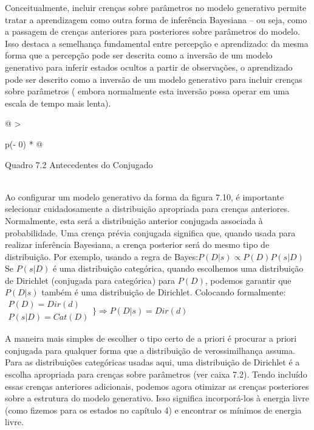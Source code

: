 \documentclass[
  12pt,
]{book}
\begin{document}
Conceitualmente, incluir crenças sobre parâmetros no modelo generativo permite tratar a aprendizagem como outra forma de inferência Bayesiana -- ou seja, como a passagem de crenças anteriores para posteriores sobre parâmetros do modelo. Isso destaca a semelhança fundamental entre percepção e aprendizado: da mesma forma que a percepção pode ser descrita como a inversão de um modelo generativo para inferir estados ocultos a partir de observações, o aprendizado pode ser descrito como a inversão de um modelo generativo para incluir crenças sobre parâmetros ( embora normalmente esta inversão possa operar em uma escala de tempo mais lenta).

\begin{longtable}[]{@{}
  >{\raggedright\arraybackslash}p{(\columnwidth - 0\tabcolsep) * }@{}}
\toprule
\begin{minipage}[b]{\linewidth}\raggedright
Quadro 7.2 Antecedentes do Conjugado
\end{minipage} \\
\midrule
\endhead
Ao configurar um modelo generativo da forma da figura 7.10, é importante selecionar cuidadosamente a distribuição apropriada para crenças anteriores. Normalmente, esta será a distribuição anterior conjugada associada à probabilidade. Uma crença prévia conjugada significa que, quando usada para realizar inferência Bayesiana, a crença posterior será do mesmo tipo de distribuição. Por exemplo, usando a regra de Bayes:\(P(D|s)\propto P(D) P(s|D)\) Se \(P(s|D)\) é uma distribuição categórica, quando escolhemos uma distribuição de Dirichlet (conjugada para categórica ) para \(P(D)\), podemos garantir que \(P(D|s)\) também é uma distribuição de Dirichlet. Colocando formalmente:\(\begin{matrix}P(D)=Dir(d) \\ P(s|D)=Cat(D)\end{matrix}\bigg \}\Rightarrow P(D|s) = Dir(d)\) \\
\bottomrule
\end{longtable}

A maneira mais simples de escolher o tipo certo de a priori é procurar a priori conjugada para qualquer forma que a distribuição de verossimilhança assuma. Para as distribuições categóricas usadas aqui, uma distribuição de Dirichlet é a escolha apropriada para crenças sobre parâmetros (ver caixa 7.2). Tendo incluído essas crenças anteriores adicionais, podemos agora otimizar as crenças posteriores sobre a estrutura do modelo generativo. Isso significa incorporá-los à energia livre (como fizemos para os estados no capítulo 4) e encontrar os mínimos de energia livre.
\end{document}
